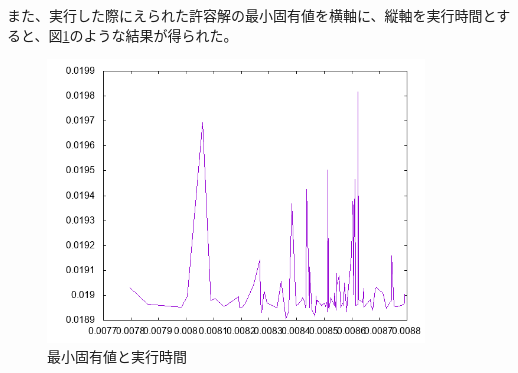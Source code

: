 また、実行した際にえられた許容解の最小固有値を横軸に、縦軸を実行時間とすると、図\ref{eigen}のような結果が得られた。
\begin{figure}
  \centering
  \includegraphics[width=10cm]{eigen.png}
  \caption{最小固有値と実行時間}
  \label{eigen}
\end{figure}

